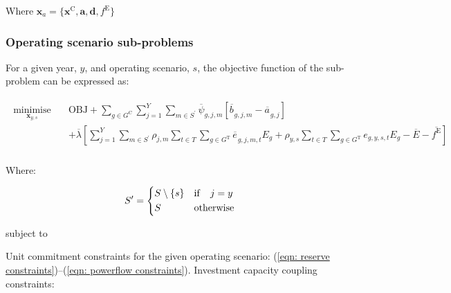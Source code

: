 \documentclass{article}
\newcommand{\sGeneratorsCandidate}{G^{\mathrm{C}}}
\newcommand{\sGeneratorsThermal}{G^{\mathrm{T}}}
\newcommand{\sYears}{Y}
\newcommand{\sScenarios}{S}
\newcommand{\sIntervals}{T}
\newcommand{\iGenerator}{g}
\newcommand{\iYear}{y}
\newcommand{\iYearAlias}{j}
\newcommand{\iScenario}{s}
\newcommand{\iScenarioAlias}{m}
\newcommand{\iInterval}{t}
\newcommand{\cScenarioDuration}[1][\iYear,\iScenario]{\rho_{#1}}
\newcommand{\cEmissionsIntensity}[1][\iGenerator]{E_{#1}}
\newcommand{\cEmmissionsCumulativeTarget}{\overline{E}}
\newcommand{\cObjectiveFunction}{\mathrm{OBJ}}
\newcommand{\vEnergy}[1][\iGenerator,\iYear,\iScenario,\iInterval]{e_{#1}}
\newcommand{\vEmissionsTargetViolation}{f^{\mathrm{E}}}
\newcommand{\vInstalledCapacityTotal}[1][\iGenerator,\iYear]{a_{#1}}
\newcommand{\vInstalledCapacityTotalScenario}[1][\iGenerator,\iYear,\iScenario]{b_{#1}}
\DeclareMathOperator*{\minimise}{minimise}
\begin{document}
Where $\bm{x}_{a} = \{\bm{x}^{\mathrm{C}}, \bm{a}, \bm{d}, \vEmissionsTargetViolation\}$

\subsubsection{Operating scenario sub-problems}
For a given year, $\iYear$, and operating scenario, $\iScenario$, the objective function of the sub-problem can be expressed as:

\begin{align}
	\begin{split}
		\minimise\limits_{\bm{x}_{\iYear,\iScenario}} \quad &\cObjectiveFunction + \sum\limits_{\iGenerator \in \sGeneratorsCandidate}\sum\limits_{\iYearAlias=1}^{\sYears}\sum\limits_{\iScenarioAlias \in \sScenarios^{\prime}} \overline{\psi}_{\iGenerator,\iYearAlias,\iScenarioAlias}\left[\overline{\vInstalledCapacityTotalScenario[]}_{\iGenerator,\iYearAlias,\iScenarioAlias} - \overline{\vInstalledCapacityTotal[]}_{\iGenerator,\iYearAlias}\right]\\
		& + \overline{\lambda} \left[\sum\limits_{\iYearAlias=1}^{\sYears} \sum\limits_{\iScenarioAlias \in \sScenarios^{\prime}} \cScenarioDuration[\iYearAlias,\iScenarioAlias] \sum\limits_{\iInterval \in \sIntervals} \sum\limits_{\iGenerator \in \sGeneratorsThermal} \overline{\vEnergy[]}_{\iGenerator,\iYearAlias,\iScenarioAlias,\iInterval} \cEmissionsIntensity + \cScenarioDuration\sum\limits_{\iInterval \in \sIntervals}\sum\limits_{\iGenerator \in \sGeneratorsThermal} \vEnergy[\iGenerator,\iYear,\iScenario,\iInterval] \cEmissionsIntensity - \cEmmissionsCumulativeTarget - \overline{\vEmissionsTargetViolation}\right]\\
	\end{split}
\end{align}

Where:

\begin{equation}
	\sScenarios^{\prime} = 
	\begin{dcases}
	\sScenarios \setminus \{\iScenario\} & \mathrm{if} \quad \iYearAlias = \iYear\\
	\sScenarios & \mathrm{otherwise}\\
	\end{dcases}
\end{equation}

subject to

Unit commitment constraints for the given operating scenario: (\ref{eqn: reserve constraints})--(\ref{eqn: powerflow constraints}). Investment capacity coupling constraints:
\end{document}
